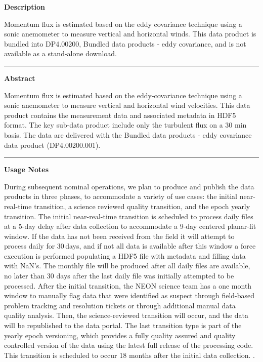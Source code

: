 \documentclass[]{article}
\begin{document}
\textbf{Description}

Momentum flux is estimated based on the eddy covariance technique using
a sonic anemometer to measure vertical and horizontal winds. This data
product is bundled into DP4.00200, Bundled data products - eddy
covariance, and is not available as a stand-alone download.

\begin{center}\rule{0.5\linewidth}{\linethickness}\end{center}

\textbf{Abstract}

Momentum flux is estimated based on the eddy-covariance technique using
a sonic anemometer to measure vertical and horizontal wind velocities.
This data product contains the measurement data and associated metadata
in HDF5 format. The key sub-data product include only the turbulent flux
on a 30 min basis. The data are delivered with the Bundled data products
- eddy covariance data product (DP4.00200.001).

\begin{center}\rule{0.5\linewidth}{\linethickness}\end{center}

\textbf{Usage Notes}

During subsequent nominal operations, we plan to produce and publish the
data products in three phases, to accommodate a variety of use cases:
the initial near-real-time transition, a science reviewed quality
transition, and the epoch yearly transition. The initial near-real-time
transition is scheduled to process daily files at a 5-day delay after
data collection to accommodate a 9-day centered planar-fit window. If
the data has not been received from the field it will attempt to process
daily for 30\,days, and if not all data is available after this window a
force execution is performed populating a HDF5 file with metadata and
filling data with NaN's. The monthly file will be produced after all
daily files are available, no later than 30 days after the last daily
file was initially attempted to be processed. After the initial
transition, the NEON science team has a one month window to manually
flag data that were identified as suspect through field-based problem
tracking and resolution tickets or through additional manual data
quality analysis. Then, the science-reviewed transition will occur, and
the data will be republished to the data portal. The last transition
type is part of the yearly epoch versioning, which provides a fully
quality assured and quality controlled version of the data using the
latest full release of the processing code. This transition is scheduled
to occur 18 months after the initial data collection. \newpage
.
\end{document}
